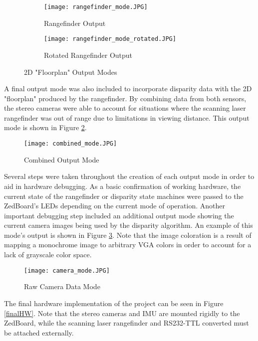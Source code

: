 \begin{figure}[H] 
         \begin{subfigure}[h]{0.5\textwidth}
              \centerline{\texttt{[image: rangefinder\_mode.JPG]}}
             \caption{Rangefinder Output}
         \end{subfigure}
         \begin{subfigure}[h]{0.5\textwidth}
             \centerline{\texttt{[image: rangefinder\_mode\_rotated.JPG]}}
             \caption{Rotated Rangefinder Output}
         \end{subfigure}
\caption{2D "Floorplan" Output Modes}
\label{rangeOutputs}
\end{figure}
\par 
A final output mode was also included to incorporate disparity data with the 2D "floorplan" produced by the rangefinder. By combining data from both sensors, the stereo cameras were able to account for situations where the scanning laser rangefinder was out of range due to limitations in viewing distance. This output mode is shown in Figure \ref{combinedOut}.
\par
\begin{figure}[H]  
 	\centerline{
	\texttt{[image: combined\_mode.JPG]}
	}
	\caption{Combined Output Mode}
	\label{combinedOut}
\end{figure} 
\par
Several steps were taken throughout the creation of each output mode in order to aid in hardware debugging. As a basic confirmation of working hardware, the current state of the rangefinder or disparity state machines were passed to the ZedBoard's LEDs depending on the current mode of operation. Another important debugging step included an additional output mode showing the current camera images being used by the disparity algorithm. An example of this mode's output is shown in Figure \ref{camOutMode}. Note that the image coloration is a result of mapping a monochrome image to arbitrary VGA colors in order to account for a lack of grayscale color space. 
\begin{figure}[H]  
 	\centerline{
	\texttt{[image: camera\_mode.JPG]}
	}
	\caption{Raw Camera Data Mode}
	\label{camOutMode}
\end{figure} 

The final hardware implementation of the project can be seen in Figure \ref{finalHW}. Note that the stereo cameras and IMU are mounted rigidly to the ZedBoard, while the scanning laser rangefinder and RS232-TTL converted must be attached externally. 

